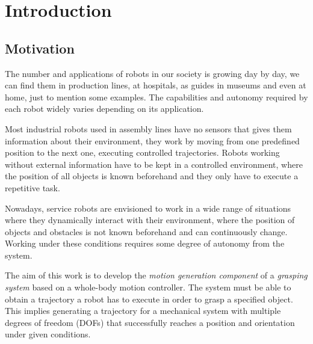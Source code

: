 

\chapter{\textbf{Introduction}}

%

\section{Motivation}
The number and applications of robots in our society is growing day by day, we can find them in production lines, at hospitals, as guides in museums and even at home, just to mention some examples. The capabilities and autonomy required by each robot widely varies depending on its application. 

Most industrial robots used in assembly lines have no sensors that gives them information about their environment, they work by moving from one predefined position to the next one, executing controlled trajectories. Robots working without external information have to be kept in a controlled environment, where the position of all objects is known beforehand and they only have to execute a repetitive task.

Nowadays, service robots are envisioned to work in a wide range of situations where they dynamically interact with their environment, where the position of objects and obstacles is not known beforehand and can continuously change. Working under these conditions requires some degree of autonomy from the system.

The aim of this work is to develop the \textit{motion generation component} of a \textit{grasping system} based on a whole-body motion controller. The system must be able to obtain a trajectory a robot has to execute in order to grasp a specified object. This implies generating a trajectory for a mechanical system with multiple degrees of freedom (DOFs) that successfully reaches a position and orientation under given conditions.

